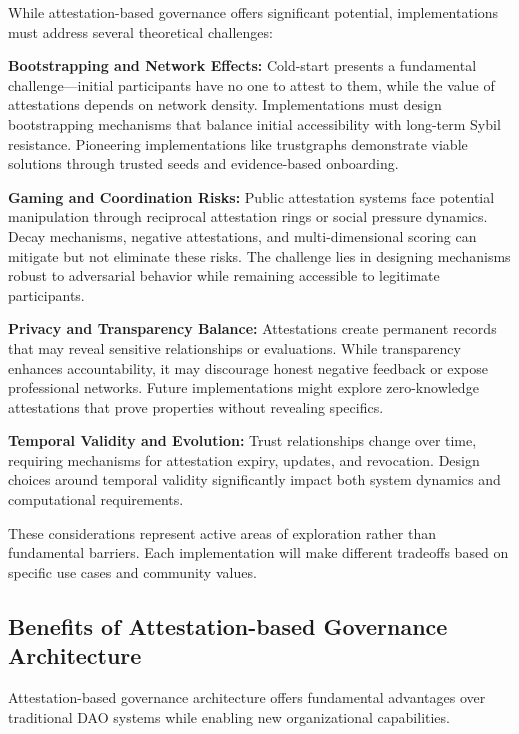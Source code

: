 While attestation-based governance offers significant potential, implementations must address several theoretical challenges:

\textbf{Bootstrapping and Network Effects:} Cold-start presents a fundamental challenge—initial participants have no one to attest to them, while the value of attestations depends on network density. Implementations must design bootstrapping mechanisms that balance initial accessibility with long-term Sybil resistance. Pioneering implementations like trustgraphs demonstrate viable solutions through trusted seeds and evidence-based onboarding.

\textbf{Gaming and Coordination Risks:} Public attestation systems face potential manipulation through reciprocal attestation rings or social pressure dynamics. Decay mechanisms, negative attestations, and multi-dimensional scoring can mitigate but not eliminate these risks. The challenge lies in designing mechanisms robust to adversarial behavior while remaining accessible to legitimate participants.

\textbf{Privacy and Transparency Balance:} Attestations create permanent records that may reveal sensitive relationships or evaluations. While transparency enhances accountability, it may discourage honest negative feedback or expose professional networks. Future implementations might explore zero-knowledge attestations that prove properties without revealing specifics.

\textbf{Temporal Validity and Evolution:} Trust relationships change over time, requiring mechanisms for attestation expiry, updates, and revocation. Design choices around temporal validity significantly impact both system dynamics and computational requirements.

These considerations represent active areas of exploration rather than fundamental barriers. Each implementation will make different tradeoffs based on specific use cases and community values.

\subsection{Benefits of Attestation-based Governance Architecture}

Attestation-based governance architecture offers fundamental advantages over traditional DAO systems while enabling new organizational capabilities.

